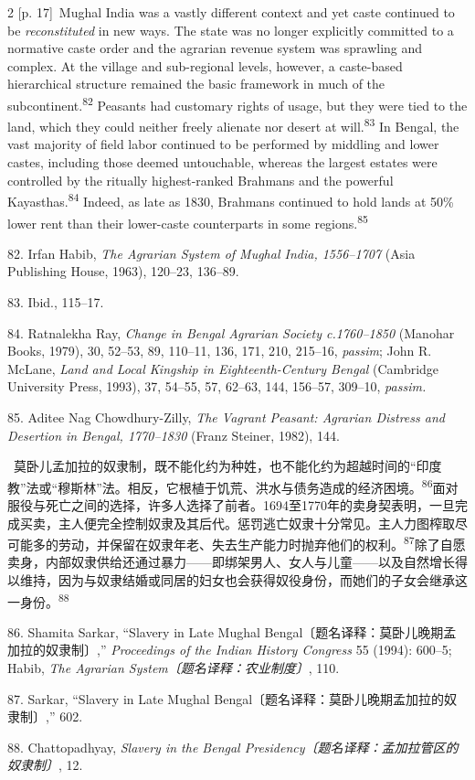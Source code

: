 \documentclass[10pt,a4paper]{article}
\begin{document}
\begin{paracol}{2}
{\scriptsize\color{gray} [p. 17]}\ Mughal India was a vastly different context and yet caste continued to be \textit{reconstituted} in new ways. The state was no longer explicitly committed to a normative caste order and the agrarian revenue system was sprawling and complex. At the village and sub-regional levels, however, a caste-based hierarchical structure remained the basic framework in much of the subcontinent.\nobreak\textsuperscript{82} Peasants had customary rights of usage, but they were tied to the land, which they could neither freely alienate nor desert at will.\nobreak\textsuperscript{83} In Bengal, the vast majority of field labor continued to be performed by middling and lower castes, including those deemed untouchable, whereas the largest estates were controlled by the ritually highest-ranked Brahmans and the powerful Kayasthas.\nobreak\textsuperscript{84} Indeed, as late as 1830, Brahmans continued to hold lands at 50\% lower rent than their lower-caste counterparts in some regions.\nobreak\textsuperscript{85}\par{\small 82. Irfan Habib, \textit{The Agrarian System of Mughal India, 1556–1707} (Asia Publishing House, 1963), 120–23, 136–89.\par}{\small 83. Ibid., 115–17.\par}{\small 84. Ratnalekha Ray, \textit{Change in Bengal Agrarian Society c.1760–1850} (Manohar Books, 1979), 30, 52–53, 89, 110–11, 136, 171, 210, 215–16, \textit{passim}; John R. McLane, \textit{Land and Local Kingship in Eighteenth-Century Bengal} (Cambridge University Press, 1993), 37, 54–55, 57, 62–63, 144, 156–57, 309–10, \textit{passim.}\par}{\small 85. Aditee Nag Chowdhury-Zilly, \textit{The Vagrant Peasant: Agrarian Distress and Desertion in Bengal, 1770–1830} (Franz Steiner, 1982), 144.\par}
\switchcolumn*
{\scriptsize\color{gray} [p. 18]}\ 莫卧儿孟加拉的奴隶制，既不能化约为种姓，也不能化约为超越时间的“印度教”法或“穆斯林”法。相反，它根植于饥荒、洪水与债务造成的经济困\mbox{境。\textsuperscript{86}}面对服役与死亡之间的选择，许多人选择了前者。1694至1770年的卖身契表明，一旦完成买卖，主人便完全控制奴隶及其后代。惩罚逃亡奴隶十分常见。主人力图榨取尽可能多的劳动，并保留在奴隶年老、失去生产能力时抛弃他们的权\mbox{利。\textsuperscript{87}}除了自愿卖身，内部奴隶供给还通过暴力——即绑架男人、女人与儿童——以及自然增长得以维持，因为与奴隶结婚或同居的妇女也会获得奴役身份，而她们的子女会继承这一身\mbox{份。\textsuperscript{88}}\par{\small 86. Shamita Sarkar, “Slavery in Late Mughal Bengal〔题名译释：莫卧儿晚期孟加拉的奴隶制〕,” \textit{Proceedings of the Indian History Congress} 55 (1994): 600–5; Habib, \textit{The Agrarian System〔题名译释：农业制度〕}, 110.\par}{\small 87. Sarkar, “Slavery in Late Mughal Bengal〔题名译释：莫卧儿晚期孟加拉的奴隶制〕,” 602.\par}{\small 88. Chattopadhyay, \textit{Slavery in the Bengal Presidency〔题名译释：孟加拉管区的奴隶制〕}, 12.\par}

\end{paracol}
\end{document}
